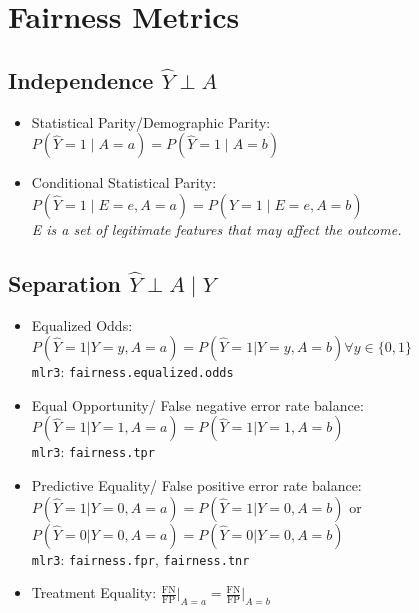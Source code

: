 \documentclass[11pt,a4paper]{article}
\begin{document}
\section{Fairness Metrics \parencite{verma2018}}

\subsection*{Independence $\hat{Y} \perp A$}
\begin{itemize}[leftmargin=2em]
    \item Statistical Parity/Demographic Parity: $P(\hat{Y} = 1 \mid A = a) = P(\hat{Y} = 1 \mid A = b)$
    \item Conditional Statistical Parity: $P(\hat{Y} = 1 \mid E = e, A = a) = P(\hat{Y} = 1 \mid E = e, A = b)$ \\ \textit{E is a set of legitimate features that may affect the outcome.}
\end{itemize}

\subsection*{Separation $\hat{Y} \perp A \mid Y$}
\begin{itemize}[leftmargin=2em]
    \item Equalized Odds: $P(\hat{Y} = 1 | Y = y, A = a) = P(\hat{Y} = 1 | Y = y, A = b) \forall y \in \{0, 1\}$ \\ \texttt{mlr3}: \texttt{fairness.equalized.odds}
    \item Equal Opportunity/ False negative error rate balance: $P(\hat{Y} = 1 | Y = 1, A = a) = P(\hat{Y} = 1 | Y = 1, A = b)$ \\ \texttt{mlr3}: \texttt{fairness.tpr}
    \item Predictive Equality/ False positive error rate balance: $P(\hat{Y} = 1 | Y = 0, A = a) = P(\hat{Y} = 1 | Y = 0, A = b)$ or \\ $P(\hat{Y} = 0 | Y = 0, A = a) = P(\hat{Y} = 0 | Y = 0, A = b)$ \\ \texttt{mlr3}: \texttt{fairness.fpr}, \texttt{fairness.tnr}
    \item Treatment Equality: $\frac{\text{FN}}{\text{FP}} \big|_{A = a} = \frac{\text{FN}}{\text{FP}} \big|_{A = b}$
\end{itemize}
\end{document}
